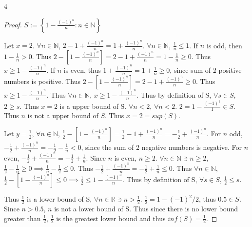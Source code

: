 \documentclass{article}
\newcommand{\R}{\mathbb{R}}
\newcommand{\N}{\mathbb{N}}
\begin{document}
\begin{PROB}{4}\label{Problem 4.}
\end{PROB}
\begin{proof}
    $S := \left\{ 1 - \frac{(-1)^n}{n} : n \in \N \right\}$ 


    Let $x = 2$. $\forall n \in \N$, $2 - 1 + \frac{(-1)^n}{n} = 1 + \frac{(-1)^n}{n}$. $\forall n \in \N$, $\frac{1}{n} \leq 1$. If $n$ is odd, then $1 - \frac{1}{n} > 0$. Thus $2 -[1 - \frac{(-1)^n}{n}] = 2 - 1 + \frac{(-1)^n}{n} =  1 - \frac{1}{n} \geq 0$. Thus $x \geq 1 - \frac{(-1)^n}{n}$. If $n $ is even, thus $1 + \frac{(-1)^n}{n} = 1 + \frac{1}{n} \geq 0$, since sum of 2 positive numbers is positive. Thus $2 -[1 - \frac{(-1)^n}{n}] = 2 - 1 + \frac{(-1)^n}{n} \geq 0$. Thus $x \geq 1 - \frac{(-1)^n}{n}$. Thus $\forall n \in \N$, $x \geq 1 - \frac{(-1)^n}{n}$. Thus by definition of S, $\forall s \in S$, $2 \geq s$.  
    Thus $x = 2$ is a upper bound of S. $\forall n < 2$, $\forall n < 2$. $2 = 1 - \frac{\left(-1\right)^1}{1}\in S$. Thus $n$ is not a upper bound of $S$. Thus $x = 2 = sup(S)$. 
    
    Let $y = \frac{1}{2}$, $\forall n \in \N$, $\frac{1}{2} - [1 - \frac{(-1)^n}{n}] = \frac{1}{2} - 1 +\frac{(-1)^n}{n} = -\frac{1}{2} + \frac{(-1)^n}{n}$. For $n$ odd, $-\frac{1}{2} + \frac{(-1)^n}{n} = -\frac{1}{2} - \frac{1}{n} < 0$, since the sum of 2 negative numbers is negative. For $n$ even, $-\frac{1}{2} + \frac{(-1)^n}{n} = -\frac{1}{2} + \frac{1}{n}$. Since $n$ is even, $n \geq 2$. $\forall n \in \N \ni n \geq 2$, $\frac{1}{2} - \frac{1}{n} \geq 0 \implies \frac{1}{n} - \frac{1}{2} \leq 0$. Thus $-\frac{1}{2} + \frac{(-1)^n}{n} = -\frac{1}{2} + \frac{1}{n} \leq 0$. Thus $\forall n \in \N$, $\frac{1}{2} - [1 - \frac{(-1)^n}{n}] \leq 0 \implies \frac{1}{2} \leq 1 - \frac{(-1)^n}{n}$. Thus by definition of S, $\forall s \in S$, $\frac{1}{2} \leq s$.
    
    Thus $\frac{1}{2}$ is a lower bound of S, $\forall n \in \R \ni n > \frac{1}{2}$. $\frac{1}{2} = 1 - (-1)^2 / 2$, thus $0.5 \in S$. Since $n > 0.5$, $n$ is not a lower bound of S. Thus since there is no lower bound greater than $\frac{1}{2}$, $\frac{1}{2}$ is the greatest lower bound and thus $inf(S) =\frac{1}{2}$.         
\end{proof}

\bigskip
\end{document}
